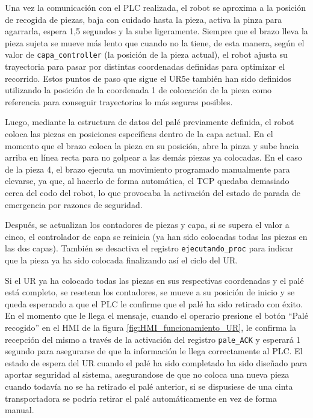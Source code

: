 Una vez la comunicación con el PLC realizada, el robot se aproxima a la posición de recogida de piezas, baja con cuidado hasta la pieza, activa la pinza para agarrarla, espera 1,5 segundos y la sube ligeramente. Siempre que el brazo lleva la pieza sujeta se mueve más lento que cuando no la tiene, de esta manera, según el valor de \texttt{capa\_controller} (la posición de la pieza actual), el robot ajusta su trayectoria para pasar por distintas coordenadas definidas para optimizar el recorrido. Estos puntos de paso que sigue el UR5e también han sido definidos utilizando la posición de la coordenada 1 de colocación de la pieza como referencia para conseguir trayectorias lo más seguras posibles.

Luego, mediante la estructura de datos del palé previamente definida, el robot coloca las piezas en posiciones específicas dentro de la capa actual. En el momento que el brazo coloca la pieza en su posición, abre la pinza y sube hacia arriba en línea recta para no golpear a las demás piezas ya colocadas. En el caso de la pieza 4, el brazo ejecuta un movimiento programado manualmente para elevarse, ya que, al hacerlo de forma automática, el TCP quedaba demasiado cerca del codo del robot, lo que provocaba la activación del estado de parada de emergencia por razones de seguridad.

Después, se actualizan los contadores de piezas y capa, si se supera el valor a cinco, el controlador de capa se reinicia (ya han sido colocadas todas las piezas en las dos capas). También se desactiva el registro \texttt{ejecutando\_proc} para indicar que la pieza ya ha sido colocada finalizando así el ciclo del UR.

Si el UR ya ha colocado todas las piezas en sus respectivas coordenadas y el palé está completo, se resetean los contadores, se mueve a su posición de inicio y se queda esperando a que el PLC le confirme que el palé ha sido retirado con éxito. En el momento que le llega el mensaje, cuando el operario presione el botón ``Palé recogido'' en el HMI de la figura \ref{fig:HMI_funcionamiento_UR}, le confirma la recepción del mismo a través de la activación del registro \texttt{pale\_ACK} y esperará 1 segundo para asegurarse de que la información le llega correctamente al PLC. El estado de espera del UR cuando el palé ha sido completado ha sido diseñado para aportar seguridad al sistema, asegurandose de que no coloca una nueva pieza cuando todavía no se ha retirado el palé anterior, si se dispusiese de una cinta transportadora se podría retirar el palé automáticamente en vez de forma manual. 


